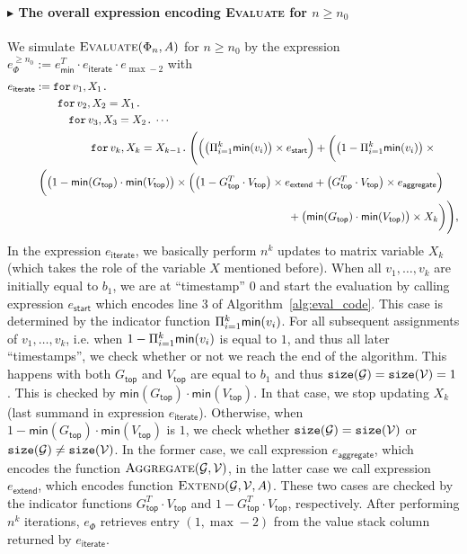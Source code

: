 \paragraph{$\blacktriangleright$ The overall expression encoding {\normalfont \textsc{Evaluate}} for $n\geq n_0$}
We simulate $\textsc{Evaluate}(\Phi_n,A)$ for $n\geq n_0$ by the expression
$e_{\Phi}^{\geq n_0}:= e_{\mathsf{min}}^T\cdot e_{\mathsf{iterate}}\cdot e_{\max -2}$ with
    \begin{align*}\allowdisplaybreaks
		e_{\mathsf{iterate}}&:= \ffor{v_1}{X_1} \\
		& \qquad\ffor{v_2}{X_2=X_1}  \\
		& \qquad \quad \ffor{v_3}{X_3=X_2}  \cdots\\
		& \qquad \qquad\quad \ffor{v_k}{X_{k}=X_{k-1}} \Biggl(\Bigl(\bigl( \sprod_{i=1}^k \mathsf{min}(v_i)\bigr) \times e_{\mathsf{start}}\Bigr) + 
        \biggl( \bigl(1- \sprod_{i=1}^k \mathsf{min}(v_i)\bigr)\times{}\\
        &\hspace{0.3em} \biggl( \bigl(1 -\mathsf{min}(G_{\mathsf{top}})\cdot \mathsf{min}(V_{\mathsf{top}})\bigr) \times \Bigl(\bigl( 1 - G_{\mathsf{top}}^T\cdot V_{\mathsf{top}}\bigr) \times e_{\mathsf{extend}} + 
        \bigl(G_{\mathsf{top}}^T\cdot V_{\mathsf{top}}\bigr) \times e_{\mathsf{aggregate}}\Bigl)  \\
        &\hspace{8cm}+\bigl(\mathsf{min}(G_{\mathsf{top}})\cdot \mathsf{min}(V_{\mathsf{top}})\bigr)\times X_k\biggr)\Biggr),
	   \end{align*}
In the expression $e_{\mathsf{iterate}}$, we basically perform $n^k$ updates to matrix variable $X_k$ (which takes the role of the variable $X$ mentioned before).
When all $v_1,\ldots,v_k$ are initially equal to $b_1$, we are at ``timestamp'' $0$ and start the evaluation by 
calling expression $e_{\mathsf{start}}$ which encodes line 3 of  Algorithm~\ref{alg:eval_code}. This case is determined by the indicator function
$ \Pi_{i=1}^k \mathsf{min}(v_i)$. For all subsequent assignments of $v_1,\ldots,v_k$, i.e. when $1- \Pi_{i=1}^k \mathsf{min}(v_i)$ is equal to $1$, and thus all later ``timestamps'', we check whether or not we reach the end of the algorithm. This happens with both $G_{\mathsf{top}}$ and $V_{\mathsf{top}}$ are equal to $b_1$
and thus $\texttt{size}(\mathcal{G})=\texttt{size}(\mathcal{V})=1$. This is checked by $\mathsf{min}(G_{\mathsf{top}})\cdot \mathsf{min}(V_{\mathsf{top}})$.
In that case, we stop updating $X_k$ (last summand in expression $e_{\mathsf{iterate}}$). Otherwise, when $1-\mathsf{min}(G_{\mathsf{top}})\cdot \mathsf{min}(V_{\mathsf{top}})$ is $1$, we check whether $\texttt{size}(\mathcal{G})=\texttt{size}(\mathcal{V})$ or $\texttt{size}(\mathcal{G})\neq \texttt{size}(\mathcal{V})$. In the former case, we call expression $e_{\mathsf{aggregate}}$, which encodes the function $\textsc{Aggregate}(\mathcal{G},\mathcal{V})$, in the latter case we call expression $e_{\mathsf{extend}}$, which encodes function $\textsc{Extend}(\mathcal{G},\mathcal{V},A)$. These two cases are checked by the indicator functions $G_{\mathsf{top}}^T\cdot V_{\mathsf{top}}$ and  $1 - G_{\mathsf{top}}^T\cdot V_{\mathsf{top}}$, respectively. After performing $n^k$ iterations, $e_\Phi$ retrieves entry $(1,\max-2)$ from the value stack column returned by $e_{\mathsf{iterate}}$. 
